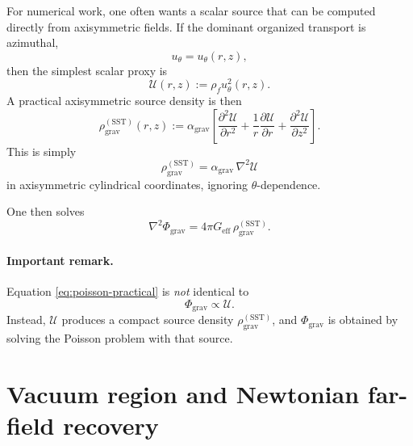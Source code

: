 \documentclass[11pt]{article}
\newcommand{\rhoF}{\rho_{\!f}}
\newcommand{\eff}{\mathrm{eff}}
\newcommand{\SST}{\mathrm{SST}}
\newcommand{\grav}{\mathrm{grav}}
\begin{document}
        For numerical work, one often wants a scalar source that can be computed directly from axisymmetric fields. If the dominant organized transport is azimuthal,
        \[
            u_\theta = u_\theta(r,z),
        \]
        then the simplest scalar proxy is
        \begin{equation}
            \mathcal{U}(r,z):=\rhoF u_\theta^2(r,z).
            \label{eq:Urz}
        \end{equation}
        A practical axisymmetric source density is then
        \begin{equation}
            \boxed{
                \rho_{\grav}^{(\SST)}(r,z)
                :=
                \alpha_{\grav}
                \left[
                    \frac{\partial^2 \mathcal{U}}{\partial r^2}
                    +
                    \frac{1}{r}\frac{\partial \mathcal{U}}{\partial r}
                    +
                    \frac{\partial^2 \mathcal{U}}{\partial z^2}
                \right].
            }
            \label{eq:rho-g-axis}
        \end{equation}
        This is simply
        \begin{equation}
            \rho_{\grav}^{(\SST)} = \alpha_{\grav}\,\nabla^2 \mathcal{U}
            \label{eq:rho-g-axis-compact}
        \end{equation}
        in axisymmetric cylindrical coordinates, ignoring \(\theta\)-dependence.
        
        One then solves
        \begin{equation}
            \boxed{
                \nabla^2 \Phi_{\grav}
                =
                4\pi G_{\eff}\,\rho_{\grav}^{(\SST)}.
            }
            \label{eq:poisson-practical}
        \end{equation}
        
        \paragraph{Important remark.}
            Equation \eqref{eq:poisson-practical} is \emph{not} identical to
            \[
                \Phi_{\grav}\propto \mathcal{U}.
            \]
            Instead, \(\mathcal{U}\) produces a compact source density \(\rho_{\grav}^{(\SST)}\), and \(\Phi_{\grav}\) is obtained by solving the Poisson problem with that source.
        
        \section{Vacuum region and Newtonian far-field recovery}
        
\end{document}
